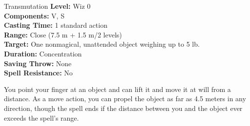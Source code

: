 {Transmutation}
{
	\textbf{Level:}
	Wiz 0\\
	\textbf{Components:}
	V, S\\
	\textbf{Casting Time:}
	1 standard action\\
	\textbf{Range:}
	Close (7.5 m + 1.5 m/2 levels)\\
	\textbf{Target:}
	One nonmagical, unattended object weighing up to 5 lb.\\
	\textbf{Duration:}
	Concentration\\
	\textbf{Saving Throw:}
	None\\
	\textbf{Spell Resistance:}
	No\\
}
{
	You point your finger at an object and can lift it and move it at will from a distance. As a move action, you can propel the object as far as 4.5 meters in any direction, though the spell ends if the distance between you and the object ever exceeds the spell's range.

}
